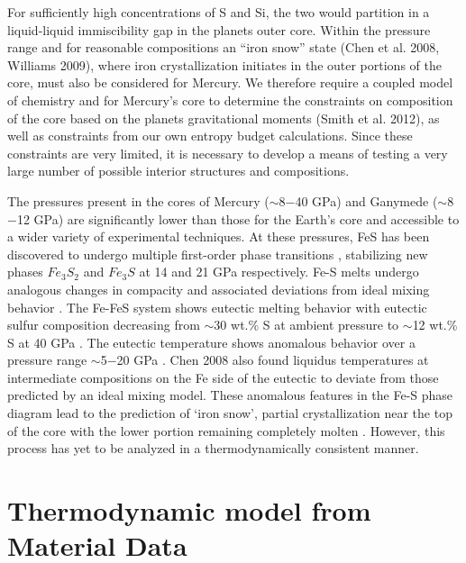 For sufficiently high concentrations of S and Si, the two would partition in a
liquid-liquid immiscibility gap in the planets outer core. Within the pressure
range and for reasonable compositions an “iron snow” state (Chen et al. 2008,
Williams 2009), where iron crystallization initiates in the outer portions of
the core, must also be considered for Mercury. We therefore require a
coupled model of chemistry and for Mercury’s core to determine the constraints
on composition of the core based on the planets gravitational moments (Smith et
al. 2012), as well as constraints from our own entropy budget calculations.
Since these constraints are very limited, it is necessary to develop a means of
testing a very large number of possible interior structures and compositions.

The pressures present in the cores of Mercury ($\sim$8$-$40 GPa) and Ganymede
($\sim$8$-$12 GPa) are significantly lower than those for the Earth's core and
accessible to a wider variety of experimental techniques. At these pressures, 
FeS has been discovered to undergo multiple first-order phase transitions
\cite{fei97,fei00}, stabilizing new phases $Fe_3S_2$ and $Fe_3S$ at 14 and 21 GPa 
respectively. Fe-S melts undergo analogous changes in compacity
\cite{morard07} and associated deviations from ideal mixing behavior
\cite{chen08}. The Fe-FeS system shows eutectic melting behavior with eutectic
sulfur composition decreasing from $\sim$30 wt.\% S at ambient pressure to $\sim$12 
wt.\% S at 40 GPa \cite{chudinovskikh07}. The eutectic temperature shows
anomalous behavior over a pressure range $\sim$5$-$20 GPa \cite{fei97,chen08}.
Chen 2008 \cite{chen08} also found liquidus temperatures at intermediate
compositions on the Fe side of the eutectic to deviate from those predicted by
an ideal mixing model. These anomalous features in the Fe-S phase diagram lead
to the prediction of `iron snow', partial crystallization near the top of the
core with the lower portion remaining completely molten \cite{hauck06,chen08}.
However, this process has yet to be analyzed in a thermodynamically consistent
manner.

\section{Thermodynamic model from Material Data}

